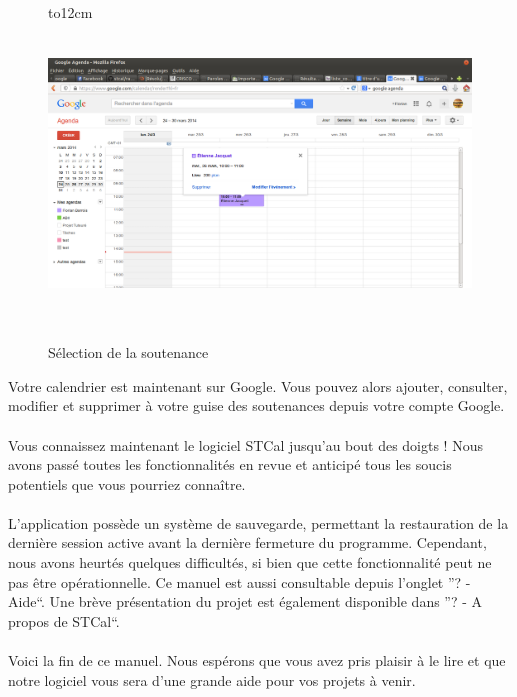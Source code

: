 \documentclass[a4paper,10pt]{report}
\begin{document}
	\paragraph{}
	
	  \begin{figure}[H]
	   \hbox to12cm{\hss\includegraphics[height=8cm,width=18cm]{../general/sout.png}\hss}
	   \caption{Sélection de la soutenance}
	 \end{figure}
	
	  Votre calendrier est maintenant sur Google.
	  Vous pouvez alors ajouter, consulter, modifier et supprimer à votre guise des soutenances depuis votre compte Google.
	  
	\newpage
	\paragraph{}
	  Vous connaissez maintenant le logiciel STCal jusqu'au bout des doigts ! 
	  Nous avons passé toutes les fonctionnalités en revue et anticipé tous les soucis potentiels que vous pourriez connaître.
	  
	\paragraph{}
	  L'application possède un système de sauvegarde, permettant la restauration de la dernière session active avant la dernière fermeture du programme.
	  Cependant, nous avons heurtés quelques difficultés, si bien que cette fonctionnalité peut ne pas être opérationnelle.
	  Ce manuel est aussi consultable depuis l'onglet ''? - Aide``.
	  Une brève présentation du projet est également disponible dans ''? - A propos de STCal``.
	

	\paragraph{}
	  Voici la fin de ce manuel.
	  Nous espérons que vous avez pris plaisir à le lire et que notre logiciel vous sera d'une grande aide pour vos projets à venir.
\end{document}
